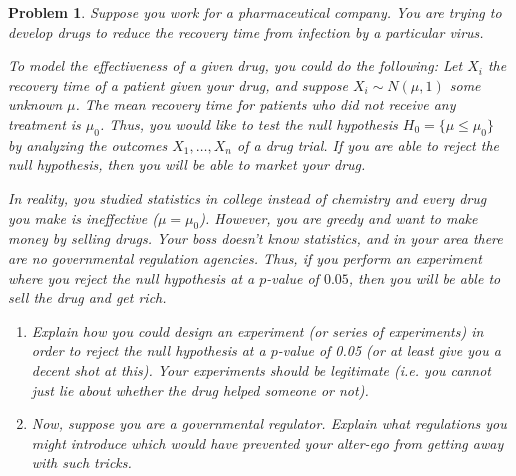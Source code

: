 \documentclass{article}
\newtheorem{problem}{Problem}
\begin{document}
\clearpage
\begin{problem}
Suppose you work for a pharmaceutical company.
You are trying to develop drugs to reduce the recovery time from infection by a particular virus.

To model the effectiveness of a given drug, you could do the following:
    Let $X_i$ the recovery time of a patient given your drug, and suppose $X_i\sim N(\mu,1)$ some unknown $\mu$.
    The mean recovery time for patients who did not receive any treatment is $\mu_0$. Thus, you would like to test the null hypothesis $H_0 = \{ \mu \leq \mu_0 \}$ by analyzing the outcomes $X_1, \ldots, X_n$ of a drug trial.
    If you are able to reject the null hypothesis, then you will be able to market your drug.

    In reality, you studied statistics in college instead of chemistry and every drug you make is ineffective ($\mu = \mu_0$).
    However, you are greedy and want to make money by selling drugs. 
    Your boss doesn't know statistics, and in your area there are no governmental regulation agencies.
    Thus, if you perform an experiment where you reject the null hypothesis at a $p$-value of $0.05$, then you will be able to sell the drug and get rich.
    
    \begin{enumerate}[label=(\alph*),topsep=0pt]
        \item Explain how you could design an experiment (or series of experiments) in order to reject the null hypothesis at a $p$-value of 0.05 (or at least give you a decent shot at this).
            Your experiments should be legitimate (i.e. you cannot just lie about whether the drug helped someone or not).

        \item Now, suppose you are a governmental regulator. 
            Explain what regulations you might introduce which would have prevented your alter-ego from getting away with such tricks.
    
    \end{enumerate}

\end{problem}
\end{document}
